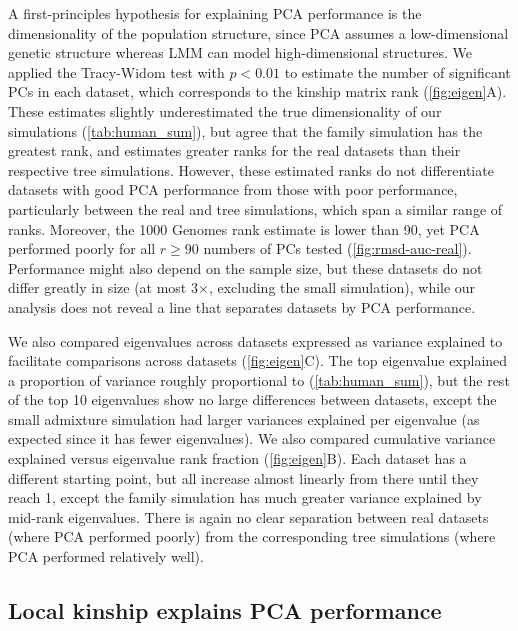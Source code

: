 \documentclass[11pt]{article}
\begin{document}
A first-principles hypothesis for explaining PCA performance is the dimensionality of the population structure, since PCA assumes a low-dimensional genetic structure whereas LMM can model high-dimensional structures.
We applied the Tracy-Widom test \citep{patterson_population_2006} with $p < 0.01$ to estimate the number of significant PCs in each dataset, which corresponds to the kinship matrix rank (\cref{fig:eigen}A).
These estimates slightly underestimated the true dimensionality of our simulations (\cref{tab:human_sum}), but agree that the family simulation has the greatest rank, and estimates greater ranks for the real datasets than their respective tree simulations.
However, these estimated ranks do not differentiate datasets with good PCA performance from those with poor performance, particularly between the real and tree simulations, which span a similar range of ranks.
Moreover, the 1000 Genomes rank estimate is lower than 90, yet PCA performed poorly for all $r \ge 90$ numbers of PCs tested (\cref{fig:rmsd-auc-real}).
Performance might also depend on the sample size, but these datasets do not differ greatly in size (at most 3$\times$, excluding the small simulation), while our analysis does not reveal a line that separates datasets by PCA performance.

We also compared eigenvalues across datasets expressed as variance explained to facilitate comparisons across datasets (\cref{fig:eigen}C).
The top eigenvalue explained a proportion of variance roughly proportional to \Fst (\cref{tab:human_sum}), but the rest of the top 10 eigenvalues show no large differences between datasets, except the small admixture simulation had larger variances explained per eigenvalue (as expected since it has fewer eigenvalues).
We also compared cumulative variance explained versus eigenvalue rank fraction (\cref{fig:eigen}B).
Each dataset has a different starting point, but all increase almost linearly from there until they reach 1, except the family simulation has much greater variance explained by mid-rank eigenvalues.
There is again no clear separation between real datasets (where PCA performed poorly) from the corresponding tree simulations (where PCA performed relatively well).

\subsection{Local kinship explains PCA performance}
\end{document}

